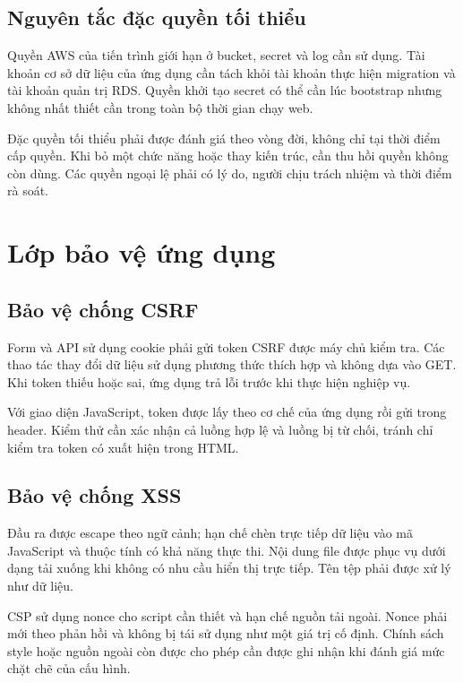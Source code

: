 \subsection{Nguyên tắc đặc quyền tối thiểu}
Quyền AWS của tiến trình giới hạn ở bucket, secret và log cần sử dụng. Tài khoản cơ sở dữ liệu của ứng dụng cần tách khỏi tài khoản thực hiện migration và tài khoản quản trị RDS. Quyền khởi tạo secret có thể cần lúc bootstrap nhưng không nhất thiết cần trong toàn bộ thời gian chạy web.

Đặc quyền tối thiểu phải được đánh giá theo vòng đời, không chỉ tại thời điểm cấp quyền. Khi bỏ một chức năng hoặc thay kiến trúc, cần thu hồi quyền không còn dùng. Các quyền ngoại lệ phải có lý do, người chịu trách nhiệm và thời điểm rà soát.

\section{Lớp bảo vệ ứng dụng}
\subsection{Bảo vệ chống CSRF}
Form và API sử dụng cookie phải gửi token CSRF được máy chủ kiểm tra. Các thao tác thay đổi dữ liệu sử dụng phương thức thích hợp và không dựa vào GET. Khi token thiếu hoặc sai, ứng dụng trả lỗi trước khi thực hiện nghiệp vụ.

Với giao diện JavaScript, token được lấy theo cơ chế của ứng dụng rồi gửi trong header. Kiểm thử cần xác nhận cả luồng hợp lệ và luồng bị từ chối, tránh chỉ kiểm tra token có xuất hiện trong HTML.
\subsection{Bảo vệ chống XSS}
Đầu ra được escape theo ngữ cảnh; hạn chế chèn trực tiếp dữ liệu vào mã JavaScript và thuộc tính có khả năng thực thi. Nội dung file được phục vụ dưới dạng tải xuống khi không có nhu cầu hiển thị trực tiếp. Tên tệp phải được xử lý như dữ liệu.

CSP sử dụng nonce cho script cần thiết và hạn chế nguồn tải ngoài. Nonce phải mới theo phản hồi và không bị tái sử dụng như một giá trị cố định. Chính sách style hoặc nguồn ngoài còn được cho phép cần được ghi nhận khi đánh giá mức chặt chẽ của cấu hình.
